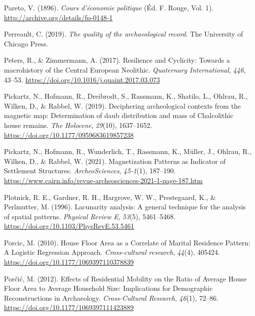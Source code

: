 \documentclass[
  12pt,
]{book}
\newlength{\cslhangindent}
\newlength{\cslentryspacingunit} %
\newenvironment{CSLReferences}[2] %
 {%
  \setlength{\parindent}{0pt}
  \ifodd #1
  \let\oldpar\par
  \def\par{\hangindent=\cslhangindent\oldpar}
  \fi
  \setlength{\parskip}{#2\cslentryspacingunit}
 }%
 {}
\begin{document}
\begin{CSLReferences}{1}{0}
\leavevmode{}%
Pareto, V. (1896). \emph{Cours d'économie politique} (Éd. F. Rouge, Vol. 1). \url{http://archive.org/details/fp-0148-1}

\leavevmode{}%
Perreault, C. (2019). \emph{The quality of the archaeological record}. The University of Chicago Press.

\leavevmode{}%
Peters, R., \& Zimmermann, A. (2017). Resilience and Cyclicity: Towards a macrohistory of the Central European Neolithic. \emph{Quaternary International}, \emph{446}, 43--53. \url{https://doi.org/10.1016/j.quaint.2017.03.073}

\leavevmode{}%
Pickartz, N., Hofmann, R., Dreibrodt, S., Rassmann, K., Shatilo, L., Ohlrau, R., Wilken, D., \& Rabbel, W. (2019). Deciphering archeological contexts from the magnetic map: Determination of daub distribution and mass of Chalcolithic house remains. \emph{The Holocene}, \emph{29}(10), 1637--1652. \url{https://doi.org/10.1177/0959683619857238}

\leavevmode{}%
Pickartz, N., Hofmann, R., Wunderlich, T., Rassmann, K., Müller, J., Ohlrau, R., Wilken, D., \& Rabbel, W. (2021). Magnetization Patterns as Indicator of Settlement Structures. \emph{ArcheoSciences}, \emph{45-1}(1), 187--190. \url{https://www.cairn.info/revue-archeosciences-2021-1-page-187.htm}

\leavevmode{}%
Plotnick, R. E., Gardner, R. H., Hargrove, W. W., Prestegaard, K., \& Perlmutter, M. (1996). Lacunarity analysis: A general technique for the analysis of spatial patterns. \emph{Physical Review E}, \emph{53}(5), 5461--5468. \url{https://doi.org/10.1103/PhysRevE.53.5461}

\leavevmode{}%
Porcic, M. (2010). House Floor Area as a Correlate of Marital Residence Pattern: A Logistic Regression Approach. \emph{Cross-cultural research}, \emph{44}(4), 405424. \url{https://doi.org/10.1177/1069397110378839}

\leavevmode{}%
Porčić, M. (2012). Effects of Residential Mobility on the Ratio of Average House Floor Area to Average Household Size: Implications for Demographic Reconstructions in Archaeology. \emph{Cross-Cultural Research}, \emph{46}(1), 72--86. \url{https://doi.org/10.1177/1069397111423889}


\end{CSLReferences}
\end{document}
